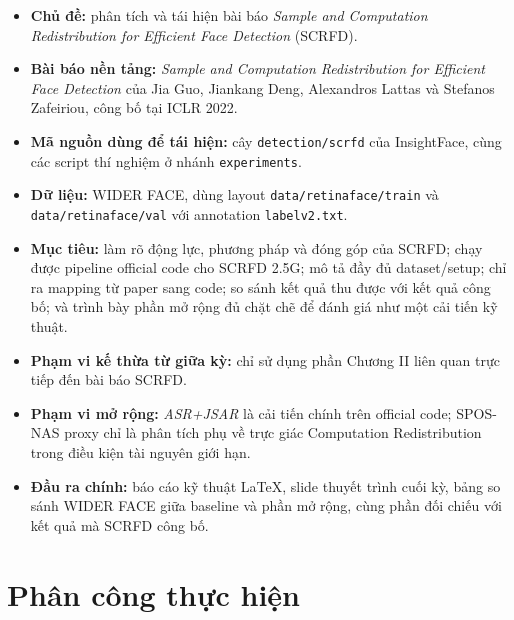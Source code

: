 \begin{itemize}
  \item \textbf{Chủ đề:} phân tích và tái hiện bài báo \textit{Sample and Computation Redistribution for Efficient Face Detection} (SCRFD).
  \item \textbf{Bài báo nền tảng:} \textit{Sample and Computation Redistribution for Efficient Face Detection} của Jia Guo, Jiankang Deng, Alexandros Lattas và Stefanos Zafeiriou, công bố tại ICLR 2022. \cite{guo2022scrfd}
  \item \textbf{Mã nguồn dùng để tái hiện:} cây \texttt{detection/scrfd} của InsightFace, cùng các script thí nghiệm ở nhánh \texttt{experiments}. \cite{insightface2026}
  \item \textbf{Dữ liệu:} WIDER FACE, dùng layout \texttt{data/retinaface/train} và \texttt{data/retinaface/val} với annotation \texttt{labelv2.txt}. \cite{yang2016widerface}
  \item \textbf{Mục tiêu:} làm rõ động lực, phương pháp và đóng góp của SCRFD; chạy được pipeline official code cho SCRFD 2.5G; mô tả đầy đủ dataset/setup; chỉ ra mapping từ paper sang code; so sánh kết quả thu được với kết quả công bố; và trình bày phần mở rộng đủ chặt chẽ để đánh giá như một cải tiến kỹ thuật.
  \item \textbf{Phạm vi kế thừa từ giữa kỳ:} chỉ sử dụng phần Chương II liên quan trực tiếp đến bài báo SCRFD.
  \item \textbf{Phạm vi mở rộng:} \textit{ASR+JSAR} là cải tiến chính trên official code; SPOS-NAS proxy chỉ là phân tích phụ về trực giác Computation Redistribution trong điều kiện tài nguyên giới hạn.
  \item \textbf{Đầu ra chính:} báo cáo kỹ thuật LaTeX, slide thuyết trình cuối kỳ, bảng so sánh WIDER FACE giữa baseline và phần mở rộng, cùng phần đối chiếu với kết quả mà SCRFD công bố.
\end{itemize}

\clearpage
\section*{Phân công thực hiện}
{}

